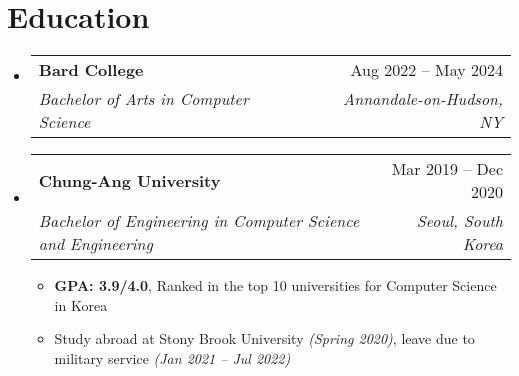 \documentclass[letterpaper,11pt]{article}
\makeatletter
\newcommand{\resumeItem}[1]{
  \item\small{
    {#1 \vspace{-2pt}}
  }
}
\newcommand{\resumeSubheading}[4]{
  \item
    \begin{tabular*}{0.98\textwidth}[t]{l@{\extracolsep{\fill}}r}
      \hspace{-1.5pt}\textbf{#1} & #2 \\
      \hspace{-1.5pt}\textit{\small#3} & \textit{\small #4} \\
    \end{tabular*}\vspace{-6pt}
}
\newcommand{\resumeSubHeadingListStart}{\begin{itemize}[leftmargin=0.1in, label={}]}
\newcommand{\resumeSubHeadingListEnd}{\end{itemize}}
\newcommand{\resumeItemListStart}{\begin{itemize}[leftmargin=0.22in]}
\newcommand{\resumeItemListEnd}{\end{itemize}\vspace{-5.7pt}}
\makeatother
\begin{document}
\section{Education}
  \resumeSubHeadingListStart
    \resumeSubheading
      {Bard College}{Aug 2022 -- May 2024}
      {Bachelor of Arts in Computer Science}{Annandale-on-Hudson, NY}
    \resumeSubheading
      {Chung-Ang University}{Mar 2019 -- Dec 2020}
      {Bachelor of Engineering in Computer Science and Engineering}{Seoul, South Korea}
      \resumeItemListStart
        \resumeItem{\textbf{GPA: 3.9/4.0}, Ranked in the top 10 universities for Computer Science in Korea}
        \resumeItem{Study abroad at Stony Brook University \textit{(Spring 2020)}, leave due to military service \textit{(Jan 2021 -- Jul 2022)}}
      \resumeItemListEnd
  \resumeSubHeadingListEnd

\end{document}
